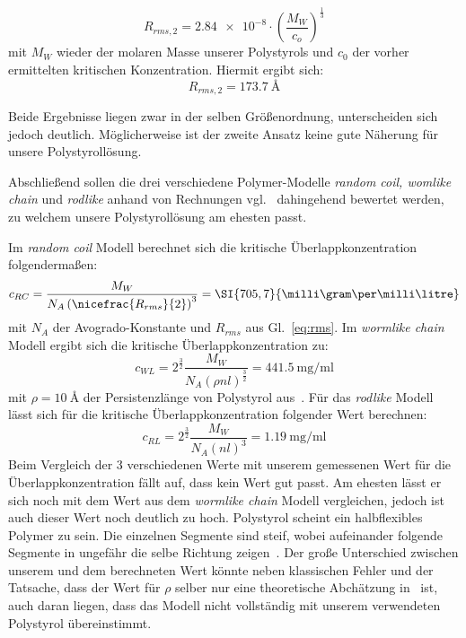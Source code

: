\begin{equation}
    R_{rms, 2} = \num{2,84e-8} \cdot \left(\frac{M_W}{c_o}\right)^\frac{1}{3}
\end{equation}
mit $M_W$ wieder der molaren Masse unserer Polystyrols und $c_0$ der vorher ermittelten kritischen Konzentration. Hiermit ergibt sich:
\begin{equation*}
    R_{rms, 2} = \SI{173,7}{\angstrom}
\end{equation*}

Beide Ergebnisse liegen zwar in der selben Größenordnung, unterscheiden sich jedoch deutlich. Möglicherweise ist der zweite Ansatz keine gute Näherung für unsere Polystyrollösung.

Abschließend sollen die drei verschiedene Polymer-Modelle \textit{random coil, womlike chain} und \textit{rodlike} anhand von Rechnungen vgl.~\cite[]{regimes} dahingehend bewertet werden, zu welchem unsere Polystyrollösung am ehesten passt. 

Im \textit{random coil} Modell berechnet sich die kritische Überlappkonzentration folgendermaßen:
\begin{equation}
    c_{RC} = \frac{M_W}{N_A \left(\nicefrac{R_{rms}}{2}\right)^3} = \SI{705,7}{\milli\gram\per\milli\litre}
\end{equation}
mit $N_A$ der Avogrado-Konstante und $R_{rms}$ aus Gl.~\ref{eq:rms}.
Im \textit{wormlike chain} Modell ergibt sich die kritische Überlappkonzentration zu:
\begin{equation}
    c_{WL} = 2^\frac{3}{2} \frac{M_W}{N_A \left(\rho n l\right)^\frac{3}{2}} = \SI{441,5}{\milli\gram\per\milli\litre}
\end{equation}
mit $\rho = \SI{10}{\angstrom}$ der Persistenzlänge von Polystyrol aus~\cite{density}.
Für das \textit{rodlike} Modell lässt sich für die kritische Überlappkonzentration folgender Wert berechnen:
\begin{equation}
    c_{RL} = 2^\frac{3}{2} \frac{M_W}{N_A \left(nl\right)^3} = \SI{1,19}{\milli\gram\per\milli\litre}
\end{equation}
Beim Vergleich der 3 verschiedenen Werte mit unserem gemessenen Wert für die Überlappkonzentration fällt auf, dass kein Wert gut passt. Am ehesten lässt er sich noch mit dem Wert aus dem \textit{wormlike chain} Modell vergleichen, jedoch ist auch dieser Wert noch deutlich zu hoch. Polystyrol scheint ein halbflexibles Polymer zu sein. Die einzelnen Segmente sind steif, wobei aufeinander folgende Segmente in ungefähr die selbe Richtung zeigen~\cite[]{regimes}. 
Der große Unterschied zwischen unserem und dem berechneten Wert könnte neben klassischen Fehler und der Tatsache, dass der Wert für $\rho$ selber nur eine theoretische Abchätzung in~\cite{density} ist, auch daran liegen, dass das Modell nicht vollständig mit unserem verwendeten Polystyrol übereinstimmt.